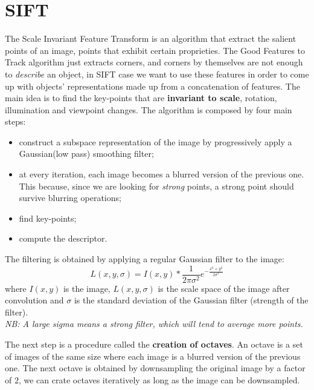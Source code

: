 \section{SIFT}
The Scale Invariant Feature Transform is an algorithm that extract the salient points of an image, points that exhibit certain proprieties. The Good Features to Track algorithm just extracts corners, and corners by themselves are not enough to \textit{describe} an object, in SIFT case we want to use these features in order to come up with objects' representations made up from a concatenation of features.
The main idea is to find the key-points that are \textbf{invariant to scale}, rotation, illumination and viewpoint changes.
The algorithm is composed by four main steps:
\begin{itemize}
    \item construct a subspace representation of the image by progressively apply a Gaussian(low pass) smoothing filter;
    \item at every iteration, each image becomes a blurred version of the previous one. This because, since we are looking for \textit{strong} points, a strong point should survive blurring operations;
    \item find key-points;
    \item compute the descriptor.
\end{itemize}
The filtering is obtained by applying a regular Gaussian filter to the image:
\[
    L(x,y,\sigma) = I(x,y) * \frac{1}{2\pi\sigma^2}e^{-\frac{x^2+y^2}{2\sigma^2}}
\]
where $I(x,y)$ is the image, $L(x,y,\sigma)$ is the scale space of the image after convolution and $\sigma$ is the standard deviation of the Gaussian filter (strength of the filter).
\\\textit{NB: A large sigma means a strong filter, which will tend to average more points.}

The next step is a procedure called the \textbf{creation of octaves}. An octave is a set of images of the same size where each image is a blurred version of the previous one. The next octave is obtained by downsampling the original image by a factor of $2$, we can crate octaves iteratively as long as the image can be downsampled.

